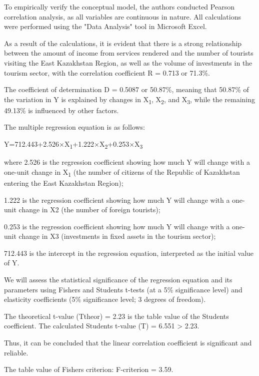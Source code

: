 To empirically verify the conceptual model, the authors conducted
Pearson correlation analysis, as all variables are continuous in nature.
All calculations were performed using the "Data Analysis" tool in
Microsoft Excel.

As a result of the calculations, it is evident that there is a strong
relationship between the amount of income from services rendered and the
number of tourists visiting the East Kazakhstan Region, as well as the
volume of investments in the tourism sector, with the correlation
coefficient R = 0.713 or 71.3\%.

The coefficient of determination D = 0.5087 or 50.87\%, meaning that
50.87\% of the variation in Y is explained by changes in
X\textsubscript{1}, X\textsubscript{2}, and X\textsubscript{3}, while
the remaining 49.13\% is influenced by other factors.

The multiple regression equation is as follows:

Y=712.443+2.526×X\textsubscript{1}+1.222×X\textsubscript{2}+0.253×X\textsubscript{3}

where 2.526 is the regression coefficient showing how much Y will change
with a one-unit change in X\textsubscript{1} (the number of citizens of
the Republic of Kazakhstan entering the East Kazakhstan Region);

1.222 is the regression coefficient showing how much Y will change with
a one-unit change in X2 (the number of foreign tourists);

0.253 is the regression coefficient showing how much Y will change with
a one-unit change in X3 (investments in fixed assets in the tourism
sector);

712.443 is the intercept in the regression equation, interpreted as the
initial value of Y.

We will assess the statistical significance of the regression equation
and its parameters using Fisher\textquotesingle s and
Student\textquotesingle s t-tests (at a 5\% significance level) and
elasticity coefficients (5\% significance level; 3 degrees of freedom).

The theoretical t-value (Ttheor) = 2.23 is the table value of the
Student\textquotesingle s coefficient. The calculated
Student\textquotesingle s t-value (T) = 6.551 \textgreater{} 2.23.

Thus, it can be concluded that the linear correlation coefficient is
significant and reliable.

The table value of Fisher\textquotesingle s criterion: F-criterion =
3.59.

